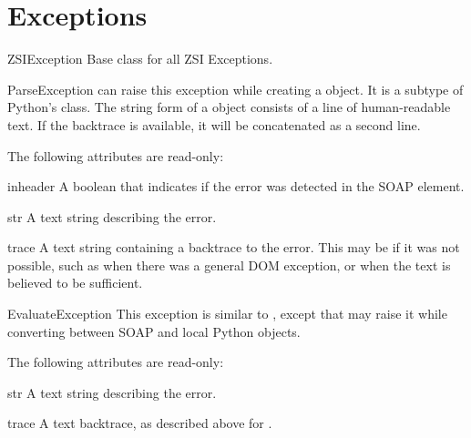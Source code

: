 \chapter{Exceptions}

\begin{excdesc}{ZSIException}
Base class for all ZSI Exceptions.
\end{excdesc}

\begin{excdesc}{ParseException}
\ZSI{} can raise this exception while creating a  object.
It is a subtype of Python's  class.
The string form of a  object consists of a
line of human-readable text.
If the backtrace is available, it will be concatenated as a second line.
\end{excdesc}

The following attributes are read-only:

\begin{memberdesc}{inheader}
A boolean that indicates if the error was detected in the SOAP 
element.
\end{memberdesc}

\begin{memberdesc}{str}
A text string describing the error.
\end{memberdesc}

\begin{memberdesc}{trace}
A text string containing a backtrace to the error.
This may be  if it was not possible, such as when there was
a general DOM exception, or when the  text is believed to be
sufficient.
\end{memberdesc}

\begin{excdesc}{EvaluateException}
This exception is similar to , except
that \ZSI{} may raise it while converting between SOAP and local
Python objects.
\end{excdesc}

The following attributes are read-only:

\begin{memberdesc}{str}
A text string describing the error.
\end{memberdesc}

\begin{memberdesc}{trace}
A text backtrace, as described above for .
\end{memberdesc}

